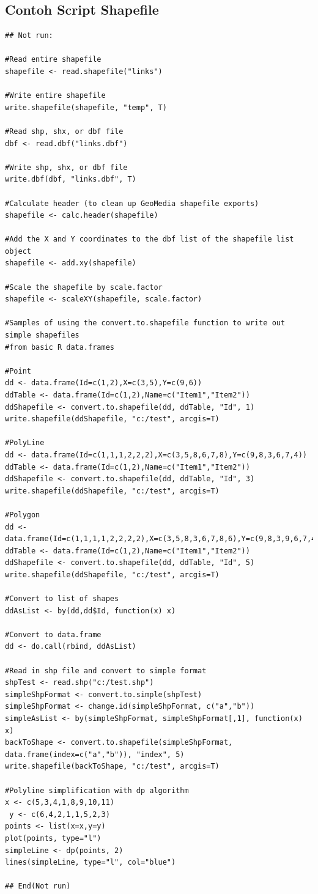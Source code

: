 \subsection{Contoh Script Shapefile}
\begin{verbatim}
## Not run: 

#Read entire shapefile 
shapefile <- read.shapefile("links") 

#Write entire shapefile 
write.shapefile(shapefile, "temp", T) 

#Read shp, shx, or dbf file 
dbf <- read.dbf("links.dbf") 

#Write shp, shx, or dbf file 
write.dbf(dbf, "links.dbf", T) 

#Calculate header (to clean up GeoMedia shapefile exports) 
shapefile <- calc.header(shapefile) 

#Add the X and Y coordinates to the dbf list of the shapefile list object 
shapefile <- add.xy(shapefile)

#Scale the shapefile by scale.factor 
shapefile <- scaleXY(shapefile, scale.factor) 

#Samples of using the convert.to.shapefile function to write out simple shapefiles 
#from basic R data.frames 

#Point 
dd <- data.frame(Id=c(1,2),X=c(3,5),Y=c(9,6)) 
ddTable <- data.frame(Id=c(1,2),Name=c("Item1","Item2")) 
ddShapefile <- convert.to.shapefile(dd, ddTable, "Id", 1) 
write.shapefile(ddShapefile, "c:/test", arcgis=T) 

#PolyLine 
dd <- data.frame(Id=c(1,1,1,2,2,2),X=c(3,5,8,6,7,8),Y=c(9,8,3,6,7,4)) 
ddTable <- data.frame(Id=c(1,2),Name=c("Item1","Item2")) 
ddShapefile <- convert.to.shapefile(dd, ddTable, "Id", 3) 
write.shapefile(ddShapefile, "c:/test", arcgis=T) 

#Polygon 
dd <- data.frame(Id=c(1,1,1,1,2,2,2,2),X=c(3,5,8,3,6,7,8,6),Y=c(9,8,3,9,6,7,4,6)) 
ddTable <- data.frame(Id=c(1,2),Name=c("Item1","Item2")) 
ddShapefile <- convert.to.shapefile(dd, ddTable, "Id", 5) 
write.shapefile(ddShapefile, "c:/test", arcgis=T)

#Convert to list of shapes 
ddAsList <- by(dd,dd$Id, function(x) x) 

#Convert to data.frame 
dd <- do.call(rbind, ddAsList) 

#Read in shp file and convert to simple format 
shpTest <- read.shp("c:/test.shp") 
simpleShpFormat <- convert.to.simple(shpTest) 
simpleShpFormat <- change.id(simpleShpFormat, c("a","b")) 
simpleAsList <- by(simpleShpFormat, simpleShpFormat[,1], function(x) x) 
backToShape <- convert.to.shapefile(simpleShpFormat, 
data.frame(index=c("a","b")), "index", 5) 
write.shapefile(backToShape, "c:/test", arcgis=T) 

#Polyline simplification with dp algorithm 
x <- c(5,3,4,1,8,9,10,11)
 y <- c(6,4,2,1,1,5,2,3) 
points <- list(x=x,y=y) 
plot(points, type="l") 
simpleLine <- dp(points, 2) 
lines(simpleLine, type="l", col="blue") 

## End(Not run) 
\end{verbatim} \cite{stabler2006shapefiles}

